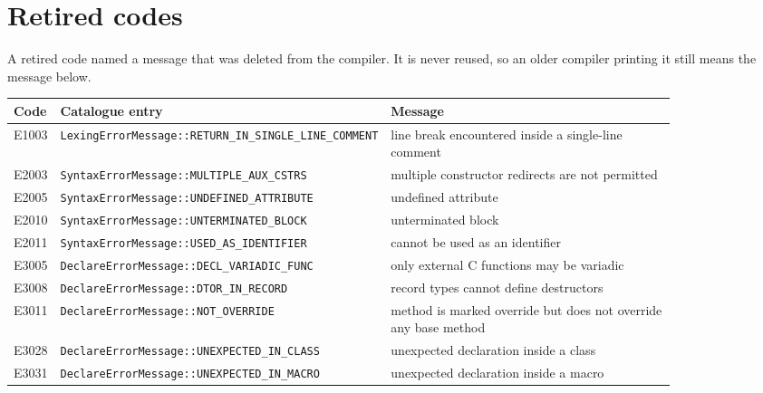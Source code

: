 
\section{Retired codes}
\label{sec:codes:retired}

A retired code named a message that was deleted from the compiler. It is
never reused, so an older compiler printing it still means the message
below.

\begin{longtable}{@{}l p{0.4\linewidth} p{0.45\linewidth}@{}}
\toprule Code & Catalogue entry & Message\\ \midrule \endhead
E1003 & \texttt{LexingErrorMessage::\allowbreak{}RETURN\_\allowbreak{}IN\_\allowbreak{}SINGLE\_\allowbreak{}LINE\_\allowbreak{}COMMENT} & line break encountered inside a single-line comment\\
E2003 & \texttt{SyntaxErrorMessage::\allowbreak{}MULTIPLE\_\allowbreak{}AUX\_\allowbreak{}CSTRS} & multiple constructor redirects are not permitted\\
E2005 & \texttt{SyntaxErrorMessage::\allowbreak{}UNDEFINED\_\allowbreak{}ATTRIBUTE} & undefined attribute \errhole{}\\
E2010 & \texttt{SyntaxErrorMessage::\allowbreak{}UNTERMINATED\_\allowbreak{}BLOCK} & unterminated block\\
E2011 & \texttt{SyntaxErrorMessage::\allowbreak{}USED\_\allowbreak{}AS\_\allowbreak{}IDENTIFIER} & \errhole{} cannot be used as an identifier\\
E3005 & \texttt{DeclareErrorMessage::\allowbreak{}DECL\_\allowbreak{}VARIADIC\_\allowbreak{}FUNC} & only external C functions may be variadic\\
E3008 & \texttt{DeclareErrorMessage::\allowbreak{}DTOR\_\allowbreak{}IN\_\allowbreak{}RECORD} & record types cannot define destructors\\
E3011 & \texttt{DeclareErrorMessage::\allowbreak{}NOT\_\allowbreak{}OVERRIDE} & method \errhole{} is marked override but does not override any base method\\
E3028 & \texttt{DeclareErrorMessage::\allowbreak{}UNEXPECTED\_\allowbreak{}IN\_\allowbreak{}CLASS} & unexpected declaration inside a class\\
E3031 & \texttt{DeclareErrorMessage::\allowbreak{}UNEXPECTED\_\allowbreak{}IN\_\allowbreak{}MACRO} & unexpected declaration inside a macro\\

\end{longtable}
